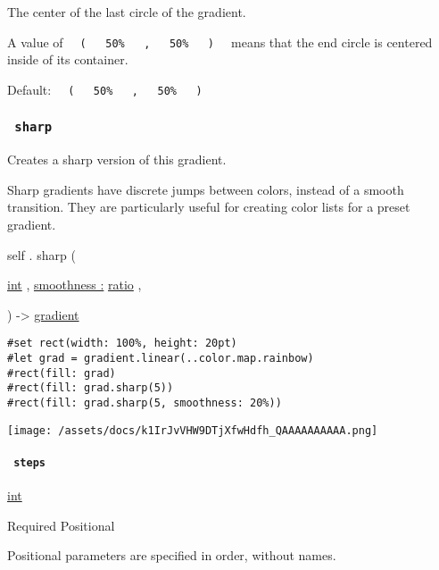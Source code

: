 The center of the last circle of the gradient.

A value of
\texttt{\ }{\texttt{\ (\ }}\texttt{\ }{\texttt{\ 50\%\ }}\texttt{\ }{\texttt{\ ,\ }}\texttt{\ }{\texttt{\ 50\%\ }}\texttt{\ }{\texttt{\ )\ }}\texttt{\ }
means that the end circle is centered inside of its container.

Default:
\texttt{\ }{\texttt{\ (\ }}\texttt{\ }{\texttt{\ 50\%\ }}\texttt{\ }{\texttt{\ ,\ }}\texttt{\ }{\texttt{\ 50\%\ }}\texttt{\ }{\texttt{\ )\ }}\texttt{\ }

\subsubsection{\texorpdfstring{\texttt{\ sharp\ }}{ sharp }}\label{definitions-sharp}

Creates a sharp version of this gradient.

Sharp gradients have discrete jumps between colors, instead of a smooth
transition. They are particularly useful for creating color lists for a
preset gradient.

self { . } { sharp } (

{ \href{/docs/reference/foundations/int/}{int} , } {
\hyperref[definitions-sharp-parameters-smoothness]{smoothness :}
\href{/docs/reference/layout/ratio/}{ratio} , }

) -\textgreater{} \href{/docs/reference/visualize/gradient/}{gradient}

\begin{verbatim}
#set rect(width: 100%, height: 20pt)
#let grad = gradient.linear(..color.map.rainbow)
#rect(fill: grad)
#rect(fill: grad.sharp(5))
#rect(fill: grad.sharp(5, smoothness: 20%))
\end{verbatim}

\texttt{[image: /assets/docs/k1IrJvVHW9DTjXfwHdfh\_QAAAAAAAAAA.png]}

\paragraph{\texorpdfstring{\texttt{\ steps\ }}{ steps }}\label{definitions-sharp-steps}

\href{/docs/reference/foundations/int/}{int}

{Required} {{ Positional }}

\label{definitions-sharp-steps-positional-tooltip}
Positional parameters are specified in order, without names.

